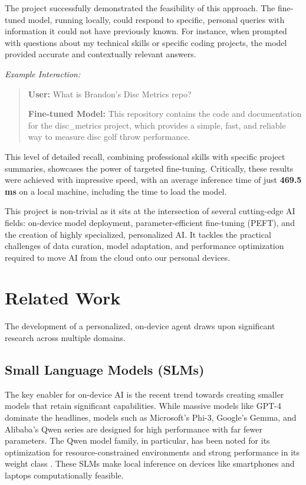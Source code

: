 \documentclass[conference]{IEEEtran}
\begin{document}
The project successfully demonstrated the feasibility of this approach. The fine-tuned model, running locally, could respond to specific, personal queries with information it could not have previously known. For instance, when prompted with questions about my technical skills or specific coding projects, the model provided accurate and contextually relevant answers.

\textit{Example Interaction:}
\begin{quote}
\textbf{User:} What is Brandon's Disc Metrics repo?

\textbf{Fine-tuned Model:} This repository contains the code and documentation for the disc\_metrics project, which provides a simple, fast, and reliable way to measure disc golf throw performance.
\end{quote}

This level of detailed recall, combining professional skills with specific project summaries, showcases the power of targeted fine-tuning. Critically, these results were achieved with impressive speed, with an average inference time of just \textbf{469.5 ms} on a local machine, including the time to load the model.

This project is non-trivial as it sits at the intersection of several cutting-edge AI fields: on-device model deployment, parameter-efficient fine-tuning (PEFT), and the creation of highly specialized, personalized AI. It tackles the practical challenges of data curation, model adaptation, and performance optimization required to move AI from the cloud onto our personal devices.

\section{Related Work}

The development of a personalized, on-device agent draws upon significant research across multiple domains.

\subsection{Small Language Models (SLMs)}
The key enabler for on-device AI is the recent trend towards creating smaller models that retain significant capabilities. While massive models like GPT-4 dominate the headlines, models such as Microsoft's Phi-3, Google's Gemma, and Alibaba's Qwen series are designed for high performance with far fewer parameters. The Qwen model family, in particular, has been noted for its optimization for resource-constrained environments and strong performance in its weight class \cite{qwen2024qwen2}. These SLMs make local inference on devices like smartphones and laptops computationally feasible.
\end{document}
